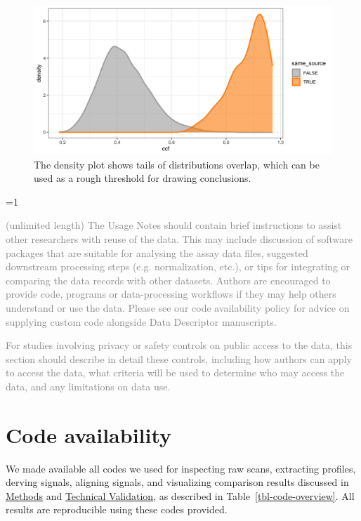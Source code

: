 \documentclass[fleqn,10pt]{wlscirep}
\newcommand{\ifinstruction}{0} %
\begin{document}
\begin{figure}[ht]
\centering
\includegraphics[width=0.8\linewidth]{ccf_density.png}
\caption{The density plot shows tails of distributions overlap, which can be used as a rough threshold for drawing conclusions.}
\label{fig-ccf-density}
\end{figure}

\ifnum \ifinstruction=1

\textcolor{gray}{(unlimited length) The Usage Notes should contain brief instructions to assist other researchers with reuse of the data. This may include discussion of software packages that are suitable for analysing the assay data files, suggested downstream processing steps (e.g. normalization, etc.), or tips for integrating or comparing the data records with other datasets. Authors are encouraged to provide code, programs or data-processing workflows if they may help others understand or use the data. Please see our code availability policy for advice on supplying custom code alongside Data Descriptor manuscripts.}

\textcolor{gray}{For studies involving privacy or safety controls on public access to the data, this section should describe in detail these controls, including how authors can apply to access the data, what criteria will be used to determine who may access the data, and any limitations on data use.}
\fi

\section*{Code availability}\label{sec-code-availability}

We made available all codes we used for inspecting raw scans, extracting
profiles, derving signals, aligning signals, and visualizing comparison
results discussed in \hyperref[sec-methods]{Methods} and
\hyperref[sec-technical-validation]{Technical Validation}, as described
in Table~\ref{tbl-code-overview}. All results are reproducible using
these codes provided.
\end{document}
